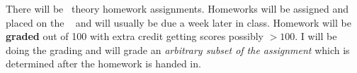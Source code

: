 There will be \numtheoryhws~theory homework assignments. Homeworks will be assigned and placed on the \coursewebpagelink~ and will usually be due a week later in class. Homework will be \textbf{graded} out of 100 with extra credit getting scores possibly $> 100$. I will be doing the grading and will grade an \textit{arbitrary subset of the assignment} which is determined after the homework is handed in. 

